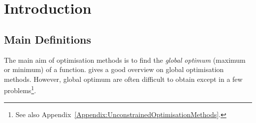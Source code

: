 \section{Introduction}\label{Chapter:GlobalOpt:Section:Introduction}

\subsection{Main Definitions}\label{Chapter:GlobalOpt:Section:Definitions}
The main aim of optimisation methods is to find the {\it global optimum} (maximum or minimum) of a function. \citet{Pardalos_2000} \citep[see also][]{Piro_2016} gives a good overview on global optimisation methods. However, global optimum are often difficult to obtain except in a few problems\footnote{See also Appendix~\ref{Appendix:UnconstrainedOptimisationMethods}.}.

